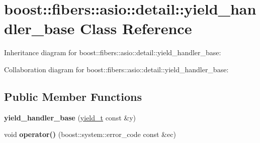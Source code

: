 \hypertarget{classboost_1_1fibers_1_1asio_1_1detail_1_1yield__handler__base}{}\section{boost\+:\+:fibers\+:\+:asio\+:\+:detail\+:\+:yield\+\_\+handler\+\_\+base Class Reference}
\label{classboost_1_1fibers_1_1asio_1_1detail_1_1yield__handler__base}


Inheritance diagram for boost\+:\+:fibers\+:\+:asio\+:\+:detail\+:\+:yield\+\_\+handler\+\_\+base\+:


Collaboration diagram for boost\+:\+:fibers\+:\+:asio\+:\+:detail\+:\+:yield\+\_\+handler\+\_\+base\+:
\subsection*{Public Member Functions}
\begin{DoxyCompactItemize}
\item 
\mbox{\label{classboost_1_1fibers_1_1asio_1_1detail_1_1yield__handler__base_a1f3fd71baf8faa1e58d2ffabb0e7c5ea}} 
{\bfseries yield\+\_\+handler\+\_\+base} (\mbox{\hyperlink{classboost_1_1fibers_1_1asio_1_1yield__t}{yield\+\_\+t}} const \&y)
\item 
\mbox{\label{classboost_1_1fibers_1_1asio_1_1detail_1_1yield__handler__base_a20b23f57f60946ff2216ae60ec778c83}} 
void {\bfseries operator()} (boost\+::system\+::error\+\_\+code const \&ec)
\end{DoxyCompactItemize}

